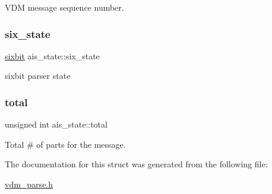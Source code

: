 V\+DM message sequence number. 

\mbox{\label{structais__state_a7f348a9ab6b6c2d0d3679a4e802879f1}} 
\subsubsection{\texorpdfstring{six\+\_\+state}{six\_state}}
{\footnotesize\ttfamily \mbox{\hyperlink{structsixbit}{sixbit}} ais\+\_\+state\+::six\+\_\+state}



sixbit parser state 

\mbox{\label{structais__state_a21fa7f41c319c8b0b8a8683424ca449e}} 
\subsubsection{\texorpdfstring{total}{total}}
{\footnotesize\ttfamily unsigned int ais\+\_\+state\+::total}



Total \# of parts for the message. 



The documentation for this struct was generated from the following file\+:\begin{DoxyCompactItemize}
\item 
\mbox{\hyperlink{vdm__parse_8h}{vdm\+\_\+parse.\+h}}\end{DoxyCompactItemize}
